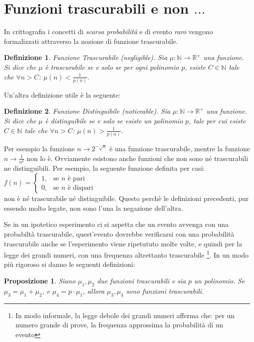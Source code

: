 \documentclass[a4paper,openright,twoside,12pt]{report}
\newtheorem{definizione}{Definizione}[chapter]
\newtheorem{proposizione}{Proposizione}[chapter]
\begin{document}
\section{Funzioni trascurabili e non $\dots$}
In crittografia i concetti di \emph{scarsa probabilit\`a} e di evento \emph{raro} vengono formalizzati attraverso la nozione di funzione trascurabile.
\begin{definizione}{Funzione Trascurabile (negligible).}
Sia $\mu: \mathbb{N} \rightarrow \mathbb{R^{+}}$ una funzione. Si dice che $\mu$ \`e trascurabile se e solo se per ogni polinomio $p$, esiste $C \in \mathbb{N} $ tale che $\forall n>C$: $\mu(n) < \frac{1}{p(n)}$.  
\end{definizione}
Un'altra definizione utile \`e la seguente:
\begin{definizione}{Funzione Distinguibile (noticeable).}
Sia $\mu: \mathbb{N} \rightarrow \mathbb{R^{+}}$ una funzione. Si dice che $\mu$ \`e distinguibile se e solo se esiste un polinomio $p$, tale per cui esiste $C \in \mathbb{N} $ tale che $\forall n>C$: $\mu(n) > \frac{1}{p(n)}$.  
\end{definizione}
Per esempio la funzione $n \rightarrow 2^{-\sqrt{n}}$ \`e una funzione trascurabile, mentre la funzione $n \rightarrow \frac{1}{n^2}$ non lo \`e. 
Ovviamente esistono anche funzioni che non sono n\'e trascurabili ne distinguibili. Per esempio, la seguente funzione definita per casi:
$f(n) = \begin{cases} 1, & \mbox{se } n\mbox{ \`e pari} \\ 0, & \mbox{se } n\mbox{ \`e dispari} \end{cases}$\\
non \`e n\'e trascurabile n\'e distinguibile. Questo perch\`e le definizioni precedenti, pur essendo molto legate, non sono l'una la negazione dell'altra.

Se in un ipotetico esperimento ci si aspetta che un evento avvenga con una probabilt\`a trascurabile,
quest'evento dovrebbe verificarsi con una probabilit\`a trascurabile anche se l'esperimento viene ripetututo molte volte, e quindi per la legge dei grandi numeri, 
con una frequenza altrettanto trascurabile
\footnote{In modo informale, la legge debole dei grandi numeri afferma che: per un numero grande di prove, 
la frequenza approssima la probabilit\`a di un evento}. 
In un modo pi\`u rigoroso si danno le seguenti definizioni:
\begin{proposizione}
Siano $\mu_1, \mu_2$ due funzioni trascurabili e sia $p$ un polinomio. Se $\mu_3 = \mu_1 + \mu_2$, e $\mu_4= p\cdot \mu_1$, allora $\mu_3, \mu_4$ sono funzioni trascurabili.  
\end{proposizione} 
\end{document}
